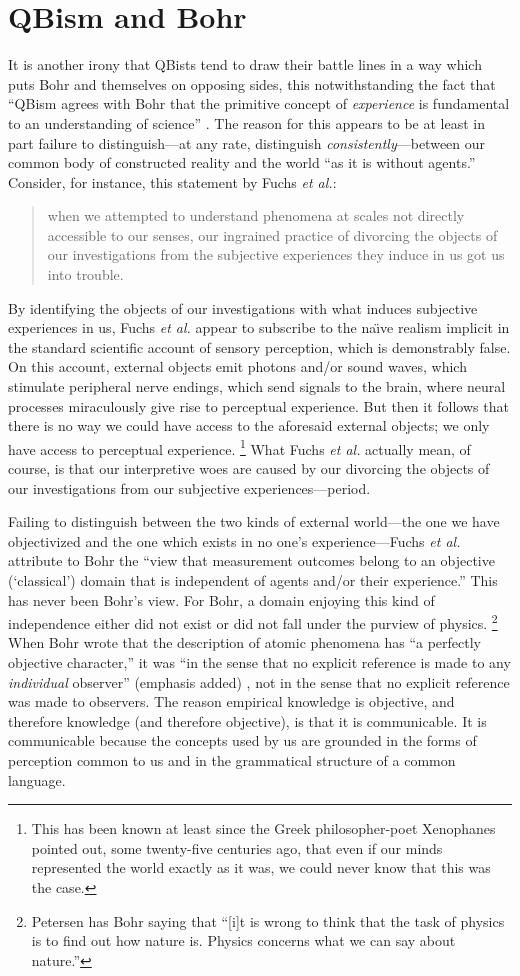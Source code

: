 \documentclass[12pt]{article}
\newcommand{\bq}{\begin{quote}}
\newcommand{\eq}{\end{quote}}
\begin{document}
\section{QBism and Bohr}\label{sec_QBB}
It is another irony that QBists tend to draw their battle lines in a way which puts Bohr and themselves on opposing sides, this notwithstanding the fact that ``QBism agrees with Bohr that the primitive concept of \emph{experience} is fundamental to an understanding of science'' \cite{FMS2014}. The reason for this appears to be at least in part failure to distinguish---at any rate, distinguish \emph{consistently}---between our common body of constructed reality and the world ``as it is without agents.'' Consider, for instance, this statement by Fuchs \emph{et al.}\cite{FMS2014}:
\bq
when we attempted to understand phenomena at scales not directly accessible to our senses, our ingrained practice of divorcing the objects of our investigations from the subjective experiences they induce in us got us into trouble.
\eq
By identifying the objects of our investigations with what induces subjective experiences in us, Fuchs \emph{et al.} appear to subscribe to the na\"\i ve realism implicit in the standard scientific account of sensory perception, which is demonstrably false. On this account, external objects emit photons and/or sound waves, which stimulate peripheral nerve endings, which send signals to the brain, where neural processes miraculously give rise to perceptual experience. But then it follows that there is no way we could have access to the aforesaid external objects; we only have access to perceptual experience.%
\footnote{This has been known at least since the Greek philosopher-poet {Xenophanes} pointed out, some twenty-five centuries ago, that even if our minds represented the world exactly as it was, we could never know that this was the case.}
What Fuchs \emph{et al.} actually mean, of course, is that our interpretive woes are caused by our divorcing the objects of our investigations from our subjective experiences---period.

Failing to distinguish between the two kinds of external world---the one we have objectivized and the one which exists in no one's experience---Fuchs \emph{et al.} attribute to Bohr the ``view that measurement outcomes belong to an objective (`classical') domain that is independent of agents and/or their experience.'' This has never been Bohr's view. For Bohr, a domain enjoying this kind of independence either did not exist or did not fall under the purview of physics.%
\footnote{Petersen \cite{Petersen1963} has Bohr saying that ``[i]t is wrong to think that the task of physics is to find out how nature is. Physics concerns what we can say about nature.''}
When Bohr wrote that the description of atomic phenomena has ``a perfectly objective character,'' it was ``in the sense that no explicit reference is made to any \emph{individual} observer'' (emphasis added) \cite{BohrE58-62}, not in the sense that no explicit reference was made to observers. The reason empirical knowledge is objective, and therefore knowledge (and therefore objective), is that it is communicable. It is communicable because the concepts used by us are grounded in the forms of perception common to us and in the grammatical structure of a common language.
\end{document}
